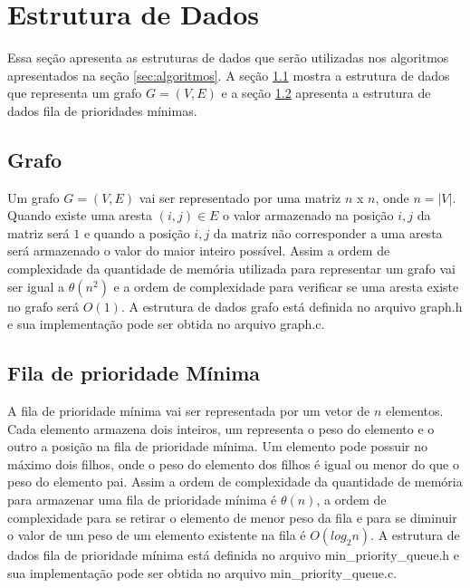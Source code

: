 \section{Estrutura de Dados}\label{sec:estrutura_dados} 
Essa seção apresenta as estruturas de dados que serão utilizadas nos algoritmos apresentados
na seção \ref{sec:algoritmos}. A seção \ref{sec:grafo} mostra a estrutura de dados que representa
um grafo $G =(V, E)$ e a seção \ref{sec:queue_min} apresenta a estrutura de dados fila de prioridades
mínimas.

\subsection{Grafo}\label{sec:grafo} 

Um grafo $G = (V, E)$ vai ser representado por uma matriz $n$ x $n$, onde $n = |V|$. Quando existe uma 
aresta $(i, j) \in E$ o valor armazenado na posição $i, j$ da matriz será $1$ e quando a posição 
$i, j$ da matriz não corresponder a uma aresta será armazenado o valor do maior inteiro possível.
Assim a ordem de complexidade da quantidade de memória utilizada para representar um grafo vai ser igual a $\theta(n ^ 2)$ e 
a ordem de complexidade para verificar se uma aresta existe no grafo será $O(1)$. A estrutura de dados grafo está
definida no arquivo graph.h e sua implementação pode ser obtida no arquivo graph.c.

\subsection{Fila de prioridade Mínima}\label{sec:queue_min}
A fila de prioridade mínima \cite{cormen3ndqueuemin} vai ser representada por um vetor de $n$ elementos. Cada elemento armazena dois inteiros, um
representa o peso do elemento e o outro a posição na fila de prioridade mínima. Um elemento pode possuir no máximo dois filhos, onde
o peso do elemento dos filhos é igual ou menor do que o peso do elemento pai. Assim a ordem de complexidade da quantidade
de memória para armazenar uma fila de prioridade mínima é $\theta(n)$, a ordem de complexidade para se retirar o elemento de menor
peso da fila e para se diminuir o valor de um peso de um elemento existente na fila é $O(log_2 n)$. A estrutura de dados fila 
de prioridade mínima está definida no arquivo min\_priority\_queue.h e sua implementação pode ser 
obtida no arquivo min\_priority\_queue.c.